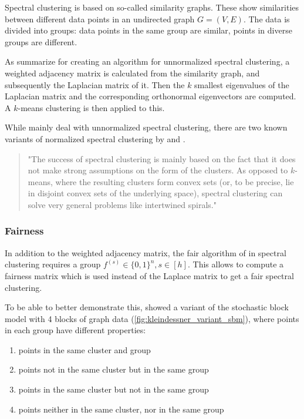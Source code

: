 Spectral clustering is based on so-called similarity graphs. These show similarities between different data points in an undirected graph $G = (V,E)$. The data is divided into groups: data points in the same group are similar, points in diverse groups are different. \autocite[2]{VonLuxburg2007}

As \textcite[2]{Kleindessner2019} summarize for creating an algorithm for unnormalized spectral clustering, a weighted adjacency matrix is calculated from the similarity graph, and subsequently the Laplacian matrix of it. Then the $k$ smallest eigenvalues of the Laplacian matrix and the corresponding orthonormal eigenvectors are computed. A $k$-means clustering is then applied to this.

While \textcite[]{Kleindessner2019} mainly deal with unnormalized spectral clustering, there are two known variants of normalized spectral clustering by \textcite[]{Shi2000} and \textcite[]{Ng2001}.

\begin{quote}
"The success of spectral clustering is mainly based on the fact that it does not make strong assumptions on the form of the clusters. As opposed to $k$-means, where the resulting clusters form convex sets (or, to be precise, lie in disjoint convex sets of the underlying space), spectral clustering can solve very general problems like intertwined spirals."
\autocite[28]{VonLuxburg2007}
\end{quote}

\subsubsection{Fairness}

In addition to the weighted adjacency matrix, the fair algorithm of \textcite[3]{Kleindessner2019} in spectral clustering requires a group $f^{(s)} \in \{0,1\}^n, s \in [h]$. This allows to compute a fairness matrix which is used instead of the Laplace matrix to get a fair spectral clustering. \autocite[3]{Kleindessner2019}

To be able to better demonstrate this, \textcite[4]{Kleindessner2019} showed a variant of the stochastic block model with 4 blocks of graph data (\ref{fig:kleindessner_variant_sbm}), where points in each group have different properties:
\begin{enumerate}
	\item points in the same cluster and group
	\item points not in the same cluster but in the same group
	\item points in the same cluster but not in the same group
	\item points neither in the same cluster, nor in the same group
\end{enumerate}

